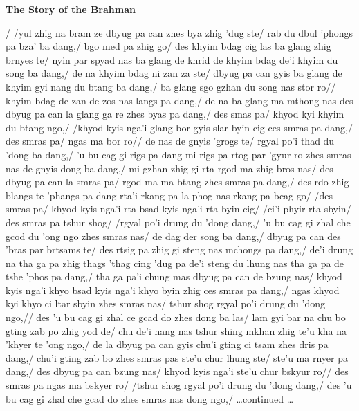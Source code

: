 \documentclass{article}
\begin{document}
\begin{center}
\Large
\textbf{The Story of  the Brahman}
\end{center}

\baselineskip30pt
{\tbfamily \pushocplist\TibetanInputOcpList
\noindent
\swasti/ /yul zhig na bram ze dbyug pa can zhes bya zhig 
'dug ste/  rab du dbul 'phongs pa bza' ba dang,/ bgo med pa 
zhig go/  des khyim bdag cig las ba glang zhig brnyes te/ nyin 
par spyad nas ba glang de khrid de khyim bdag de'i khyim du 
song ba dang,/ de na khyim bdag ni zan za ste/ dbyug pa can 
gyis ba glang de khyim gyi nang du btang ba dang,/ ba glang 
sgo gzhan du song nas stor ro//  khyim bdag de zan de zos 
nas langs pa dang,/ de na ba glang ma mthong nas des dbyug 
pa can la glang ga re zhes byas pa dang,/ des smas pa/ khyod 
kyi khyim du btang ngo,/ /khyod kyis nga'i glang bor gyis 
slar byin cig ces smras pa dang,/ des smras pa/ ngas ma 
bor ro//  de nas de gnyis 'grogs te/ rgyal po'i thad du 
'dong ba dang,/ 'u bu cag gi rigs pa dang mi rigs pa rtog 
par 'gyur ro zhes smras nas de gnyis dong ba dang,/ mi gzhan 
zhig gi rta rgod ma zhig bros nas/ des dbyug pa can la smras 
pa/ rgod ma ma btang zhes smras pa dang,/ des rdo zhig blangs 
te 'phangs pa dang rta'i rkang pa la phog nas rkang pa bcag 
go/ /des smras pa/ khyod kyis nga'i rta bsad kyis nga'i rta 
byin cig/ /ci'i phyir rta sbyin/ des smras pa tshur shog/ 
/rgyal po'i drung du 'dong dang,/ 'u bu cag gi zhal che gcod 
du 'ong ngo zhes smras nas/ de dag der song ba dang,/ dbyug 
pa can des 'bras par brtsams te/ des rtsig pa zhig gi steng 
nas mchongs pa dang,/ de'i drung na tha ga pa zhig thags 
'thag cing 'dug pa de'i steng du lhung nas tha ga pa de tshe 
'phos pa dang,/ tha ga pa'i chung mas dbyug pa can de bzung 
nas/ khyod kyis nga'i khyo bsad kyis nga'i khyo byin zhig 
ces smras pa dang,/ ngas khyod kyi khyo ci ltar sbyin zhes 
smras nas/ tshur shog rgyal po'i drung du 'dong ngo,// des 
'u bu cag gi zhal ce gcad do zhes dong ba las/  lam gyi bar 
na chu bo gting zab po zhig yod de/ chu de'i nang nas tshur 
shing mkhan zhig te'u kha na 'khyer te 'ong ngo,/ de la dbyug 
pa can gyis chu'i gting ci tsam zhes dris pa dang,/ chu'i 
gting zab bo zhes smras pas ste'u chur lhung ste/ ste'u ma
rnyer pa dang,/ des dbyug pa can bzung nas/ khyod kyis nga'i 
ste'u chur bskyur ro// des smras pa ngas ma bskyer ro/ 
/tshur shog rgyal po'i drung du 'dong dang,/ des 'u bu cag 
gi zhal che gcad do zhes smras nas dong ngo,/}
\ldots continued \ldots 
\end{document}
